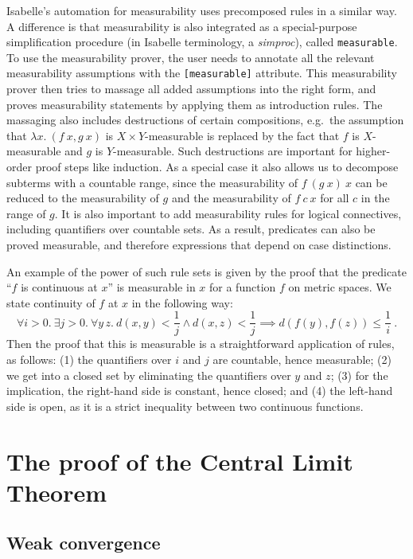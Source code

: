 \documentclass{svjour3}
\begin{document}

Isabelle's automation for measurability uses precomposed rules in a similar way. A difference is that measurability is also integrated as a special-purpose simplification procedure (in Isabelle terminology, a \emph{simproc}), called \texttt{measurable}. To use the measurability prover, the user needs to annotate all the relevant measurability assumptions with the \texttt{[measurable]} attribute. This measurability prover then tries to massage all added assumptions into the right form, and proves measurability statements by applying them as introduction rules. The massaging also includes destructions of certain compositions, e.g.~the assumption that $\lambda x.~(f~x, g~x)$ is $X \times Y$-measurable is replaced by the fact that $f$ is $X$-measurable and $g$ is $Y$-measurable. Such destructions are important for higher-order proof steps like induction. As a special case it also allows us to decompose subterms with a countable range, since the measurability of $f~(g~x)~x$ can be reduced to the measurability of $g$ and the measurability of $f~c~x$ for all $c$ in the range of $g$. It is also important to add measurability rules for logical connectives, including quantifiers over countable sets. As a result, predicates can also be proved measurable, and therefore expressions that depend on case distinctions.

An example of the power of such rule sets is given by the proof that the predicate ``$f$ is continuous at $x$'' is measurable in $x$ for a function $f$ on metric spaces. We state continuity of $f$ at $x$ in the following way:
%
\[ \forall i>0.~ \exists j>0.~ \forall y\,z.~ d(x, y) < \frac{1}{j} \land
  d(x, z) < \frac{1}{j} \implies d(f(y), f(z)) \le \frac{1}{i}~. \]
%
Then the proof that this is measurable is a straightforward application of rules, as follows: (1) the quantifiers over $i$ and $j$ are countable, hence measurable; (2) we get into a closed set by eliminating the quantifiers over $y$ and $z$; (3) for the implication, the right-hand side is constant, hence closed; and (4) the left-hand side is open, as it is a strict inequality between two continuous functions.

\section{The proof of the Central Limit Theorem}
\label{section:formal}

\subsection{Weak convergence}
\label{subsection:weak:convergence}
\end{document}
